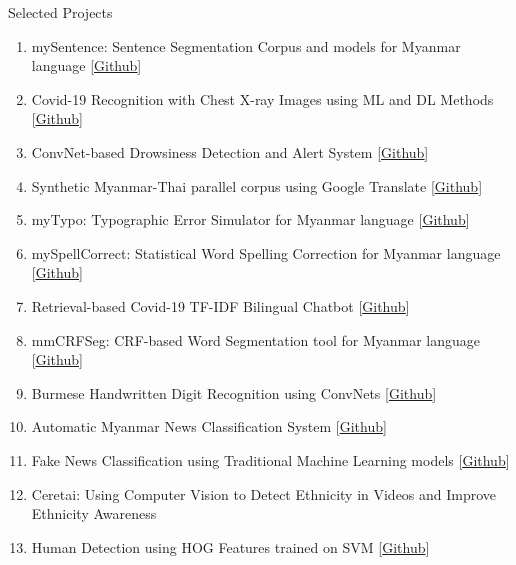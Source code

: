 \documentclass{resume} %
\begin{document}
\begin{rSection}{Selected Projects}    
\begin{enumerate}
    \item mySentence: Sentence Segmentation Corpus and models for Myanmar language [\href{https://github.com/ye-kyaw-thu/mySentence}{\underline{Github}}]
    \item Covid-19 Recognition with Chest X-ray Images using ML and DL Methods [\href{https://github.com/ThuraAung1601/Deep-Chest-X-ray-Covid19-Classification}{\underline{Github}}]
    \item ConvNet-based Drowsiness Detection and Alert System [\href{https://github.com/ThuraAung1601/drowsiness-detection}{\underline{Github}}]
    \item Synthetic Myanmar-Thai parallel corpus using Google Translate [\href{https://github.com/ThuraAung1601/Synthetic-myanmar-thai-parallel-corpus}{\underline{Github}}]
    \item myTypo: Typographic Error Simulator for Myanmar language [\href{https://github.com/ThuraAung1601/myTypo}{\underline{Github}}]
    \item mySpellCorrect: Statistical Word Spelling Correction for Myanmar language [\href{https://github.com/ThuraAung1601/mySpellCorrect}{\underline{Github}}]
    \item Retrieval-based Covid-19 TF-IDF Bilingual Chatbot [\href{https://github.com/ThuraAung1601/AskCovidDrBot}{\underline{Github}}]
    \item mmCRFSeg: CRF-based Word Segmentation tool for Myanmar language [\href{https://github.com/ThuraAung1601/mmCRFseg}{\underline{Github}}]
    \item Burmese Handwritten Digit Recognition using ConvNets [\href{https://github.com/ThuraAung1601/BHDD-using-basic-CNN}{\underline{Github}}]
    \item Automatic Myanmar News Classification System [\href{https://github.com/ThuraAung1601/Automatic-Myanmar-News-Classification}{\underline{Github}}]
    \item Fake News Classification using Traditional Machine Learning models [\href{https://github.com/ThuraAung1601/Fake-news-classification-using-machine-learning-models}{\underline{Github}}]
    \item Ceretai: Using Computer Vision to Detect Ethnicity in Videos and Improve Ethnicity Awareness
    \item Human Detection using HOG Features trained on SVM [\href{https://github.com/ThuraAung1601/human-detection-hog}{Github}]
\end{enumerate}
\end{rSection}
\end{document}
